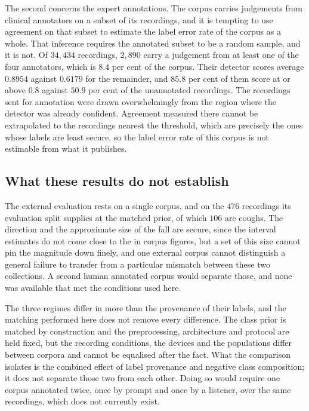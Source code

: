 \documentclass[pdflatex,sn-mathphys-num]{sn-jnl}
\begin{document}
The second concerns the expert annotations. The corpus carries judgements from clinical
annotators on a subset of its recordings, and it is tempting to use agreement on that
subset to estimate the label error rate of the corpus as a whole. That inference requires
the annotated subset to be a random sample, and it is not. Of $34{,}434$ recordings,
$2{,}890$ carry a judgement from at least one of the four annotators, which is $8.4$ per
cent of the corpus. Their detector scores average $0.8954$ against $0.6179$ for the
remainder, and $85.8$ per cent of them score at or above $0.8$ against $50.9$ per cent of
the unannotated recordings. The recordings sent for
annotation were drawn overwhelmingly from the region where the detector was already
confident. Agreement measured there cannot be extrapolated to the recordings nearest the
threshold, which are precisely the ones whose labels are least secure, so the label error
rate of this corpus is not estimable from what it publishes.

\subsection{What these results do not establish}\label{sec:res-limits}

The external evaluation rests on a single corpus, and on the $476$ recordings its
evaluation split supplies at the matched prior, of which $106$ are coughs. The direction
and the approximate size of the fall are secure, since the interval estimates do not come
close to the in corpus figures, but a set of this size cannot pin the magnitude down
finely, and one external corpus cannot distinguish a general failure to transfer from a
particular mismatch between these two collections. A second human annotated corpus would
separate those, and none was available that met the conditions used here.

The three regimes differ in more than the provenance of their labels, and the matching
performed here does not remove every difference. The class prior is matched by
construction and the preprocessing, architecture and protocol are held fixed, but the
recording conditions, the devices and the populations differ between corpora and cannot be
equalised after the fact. What the comparison isolates is the combined effect of label
provenance and negative class composition; it does not separate those two from each other.
Doing so would require one corpus annotated twice, once by prompt and once by a listener,
over the same recordings, which does not currently exist.
\end{document}
